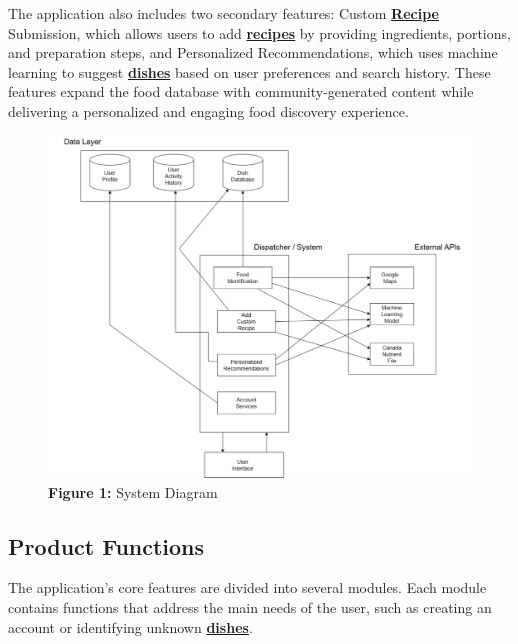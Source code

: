 \documentclass[]{article}
\begin{document}
The application also includes two secondary features: Custom \hyperref[Recipe]{\textbf{Recipe}} Submission, which allows users to add \hyperref[Recipe]{\textbf{recipes}} by providing ingredients, portions, and preparation steps, and Personalized Recommendations, which uses machine learning to suggest \hyperref[Dish]{\textbf{dishes}} based on user preferences and search history. These features expand the food database with community-generated content while delivering a personalized and engaging food discovery experience.


\begin{figure}[H]
    \centering
    \includegraphics[width=\textwidth]{image/2.1_Diagram.pdf}
    \caption{\textbf{Figure 1:} System Diagram}
\end{figure}

\subsection{Product Functions}
\label{sub:product_functions}

The application's core features are divided into several modules. Each module contains functions that address the main needs of the user, such as creating an account or identifying unknown \hyperref[Dish]{\textbf{dishes}}.
\end{document}
